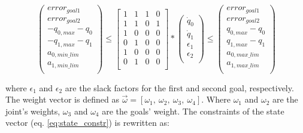 $$
\left( \begin{array}{c}
error_{goal1} \\
error_{goal2} \\
-q_{0,max} - q_{0} \\
-q_{1,max} - q_{1} \\
a_{0,min\_lim} \\
a_{1,min\_lim} \\
\end{array}
\right)	\leq 
\left[ \begin{array}{cccc}
1 & 1 & 1 & 0 \\
1 & 1 & 0 & 1 \\
1 & 0 & 0 & 0 \\
0 & 1 & 0 & 0 \\
1 & 0 & 0 & 0 \\
0 & 1 & 0 & 0 \\
\end{array}
\right] *
\left( \begin{array}{c}
\dot{q}_{0} \\
\dot{q}_{1} \\
\epsilon_1 \\
\epsilon_2 \\
\end{array}
\right) 
\leq \left( \begin{array}{c}
error_{goal1} \\
error_{goal2} \\
q_{0,max} - q_{0} \\
q_{1,max} - q_{1} \\
a_{0,max\_lim} \\
a_{1,max\_lim} \\
\end{array}
\right)
$$

where $\epsilon_1$ and $\epsilon_2$ are the slack factors for the first  and second goal, respectively. The weight vector is defined as $\vec{\omega} = [ \omega_{1},\ \omega_{2},\ \omega_{3},\ \omega_{4} ]$. Where $\omega_{1}$ and $\omega_{2}$ are the joint's weights, $\omega_{3}$ and $\omega_{4}$ are the goals' weight. The constraints of the state vector (eq. \ref{eq:state_constr}) is rewritten as:

